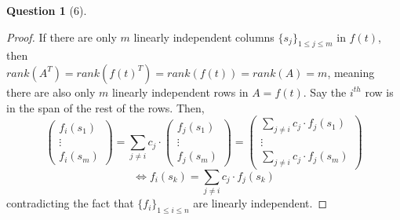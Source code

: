 \documentclass[11pt]{article}
\theoremstyle{quest}
\newtheorem*{question}{Question}
\begin{document}
\begin{question}[6]
\end{question}
\begin{proof}
If there are only $m$ linearly independent columns $\{s_j\}_{1 \le j \le m}$ in $f(t)$, then
\\$rank(A^T) = rank(f(t)^T) = rank(f(t)) = rank(A) = m$, meaning there are also only $m$ linearly independent rows in $A = f(t)$. Say the $i^{th}$ row is in the span of the rest of the rows. Then,
$$\begin{pmatrix}
f_i(s_1) \\
\vdots \\
f_i(s_m)
\end{pmatrix} = \sum_{j \ne i} c_j \cdot \begin{pmatrix}
f_j(s_1) \\
\vdots \\
f_j(s_m)
\end{pmatrix} = \begin{pmatrix}
\sum_{j \ne i} c_j \cdot f_j(s_1) \\
\vdots \\
\sum_{j \ne i} c_j \cdot f_j(s_m)
\end{pmatrix}$$
$$\iff f_i(s_k) = \sum_{j \ne i} c_j \cdot f_j(s_k)$$
contradicting the fact that $\{f_i\}_{1 \le i \le n}$ are linearly independent.
\end{proof}
\end{document}
